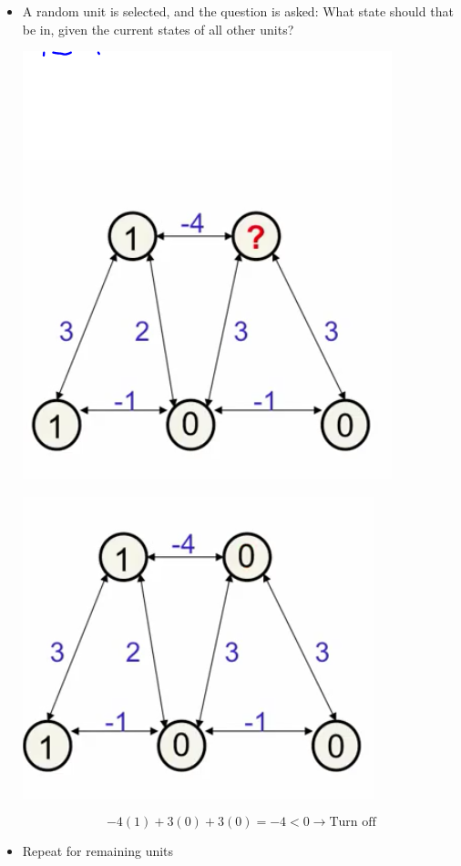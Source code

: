 \begin{itemize}
	\item A random unit is selected, and the question is asked: What state should that be in, given the current states of all other units?
	\begin{center}
		\includegraphics[scale=0.8]{sections/11/picked.png}
	\end{center}
	\begin{center}
		\includegraphics[scale=0.8]{sections/11/off.png}
	\end{center}

	$$-4(1)+3(0)+3(0)=-4<0\to \text{Turn off}$$
	\item Repeat for remaining units


\end{itemize}
